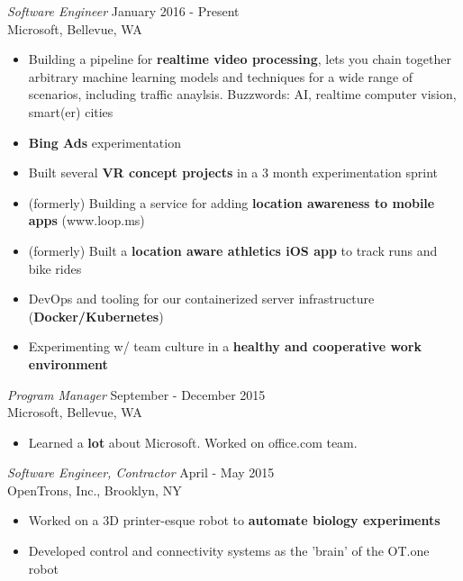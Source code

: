 \documentclass[margin,4pt]{res} %
\begin{document}
\begin{resume}
	{\sl Software Engineer} \hfill January 2016 - Present\\
		Microsoft, Bellevue, WA
		\begin{itemize} \itemsep -2pt
		\item Building a pipeline for \textbf{realtime video processing}, lets you chain together arbitrary machine learning models and techniques for a wide range of scenarios, including traffic anaylsis. Buzzwords: AI, realtime computer vision, smart(er) cities
		\item \textbf{Bing Ads} experimentation
		\item Built several \textbf{VR concept projects} in a 3 month experimentation sprint
		\item (formerly) Building a service for adding \textbf{location awareness to mobile apps} (www.loop.ms)
		\item (formerly) Built a \textbf{location aware athletics iOS app} to track runs and bike rides
		\item DevOps and tooling for our containerized server infrastructure (\textbf{Docker/Kubernetes})
		\item Experimenting w/ team culture in a \textbf{healthy and cooperative work environment}
		\end{itemize}

	{\sl Program Manager} \hfill September - December 2015\\
		Microsoft, Bellevue, WA
		\begin{itemize} \itemsep -2pt
		\item Learned a  \textbf{lot} about Microsoft. Worked on office.com team.
		\end{itemize}

	{\sl Software Engineer, Contractor} \hfill April - May 2015\\
		OpenTrons, Inc., Brooklyn, NY
		\begin{itemize} \itemsep -2pt
		\item Worked on a 3D printer-esque robot to  \textbf{automate biology experiments}
		\item Developed control and connectivity systems as the 'brain' of the OT.one robot
		\end{itemize}

	

\end{resume}
\end{document}
